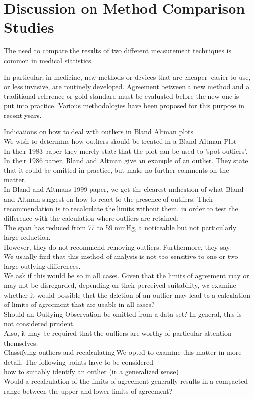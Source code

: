 \documentclass[12pt, a4paper]{report}
\begin{document}
\section{Discussion on Method Comparison Studies}

The need to compare the results of two different measurement
techniques is common in medical statistics.

In particular, in medicine, new methods or devices that are
cheaper, easier to use, or less invasive, are routinely developed.
Agreement between a new method and a traditional reference or gold
standard must be evaluated before the new one is put into
practice. Various methodologies have been proposed for this
purpose in recent years.

Indications on how to deal with outliers in Bland Altman plots
\\
We wish to determine how outliers should be treated in a Bland
Altman Plot
\\
In their 1983 paper they merely state that the plot can be used to
'spot outliers'.
\\
In  their 1986 paper, Bland and Altman give an example of an
outlier. They state that it could be omitted in practice, but make
no further comments on the matter.
\\
In Bland and Altmans 1999 paper, we get the clearest indication of
what Bland and Altman suggest on how to react to the presence of
outliers. Their recommendation is to recalculate the limits
without them, in order to test the difference with the calculation
where outliers are retained.\\

The span has reduced from 77 to 59 mmHg, a noticeable but not
particularly large reduction.
\\
However, they do not recommend removing outliers. Furthermore,
they say:
\\
We usually find that this method of analysis is not too sensitive
to one or two large outlying differences.
\\
We ask if this would be so in all cases. Given that the limits of
agreement may or may not be disregarded, depending on their
perceived suitability, we examine whether it would possible that
the deletion of an outlier may lead to a calculation of limits of
agreement that are usable in all cases?
\\
Should an Outlying Observation be omitted from a data set? In
general, this is not considered prudent.
\\
Also, it may be required that the outliers are worthy of
particular attention themselves.
\\
Classifying outliers and recalculating We opted to examine this
matter in more detail. The following points have to be considered
\\how to suitably identify an outlier (in a generalized sense)
\\Would a recalculation of the limits of agreement generally
results in  a compacted range between the upper and lower limits
of agreement?
\end{document}
